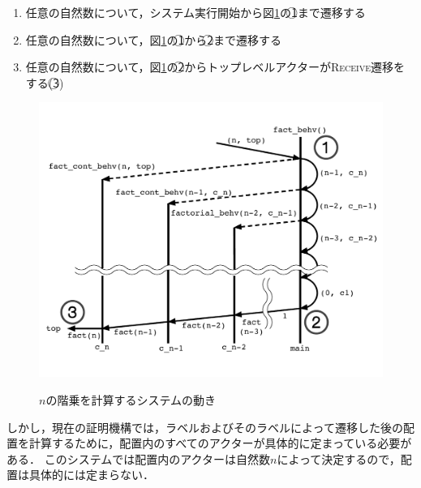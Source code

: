 
\begin{enumerate}
\item 任意の自然数について，システム実行開始から図\ref{img:conclusion:fact}の\textcircled{\scriptsize 1}まで遷移する
\item 任意の自然数について，図\ref{img:conclusion:fact}の\textcircled{\scriptsize 1}から\textcircled{\scriptsize 2}まで遷移する
\item 任意の自然数について，図\ref{img:conclusion:fact}の\textcircled{\scriptsize 2}からトップレベルアクターが\textsc{Receive}遷移をする(\textcircled{\scriptsize 3})
\end{enumerate}

\begin{figure}[tp]
  \centering
  \includegraphics[width=16cm]{./img/conclusion/fact_n.pdf}
  \label{img:conclusion:fact}
  \caption{$n$の階乗を計算するシステムの動き}
\end{figure}

しかし，現在の証明機構では，ラベルおよびそのラベルによって遷移した後の配置を計算するために，配置内のすべてのアクターが具体的に定まっている必要がある．
このシステムでは配置内のアクターは自然数$n$によって決定するので，配置は具体的には定まらない．

